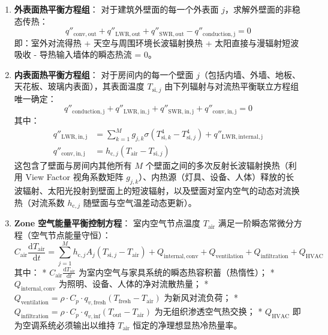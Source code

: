 \documentclass[11pt,a4paper]{article}
\begin{document}
\begin{enumerate}
    \item \textbf{外表面热平衡方程组}：
    对于建筑外壁面的每一个外表面 $j$，求解外壁面的非稳态传热：
    \begin{equation}
        q''_{\mathrm{conv,out}} + q''_{\mathrm{LWR,out}} + q''_{\mathrm{SWR,out}} - q''_{\mathrm{conduction, j}} = 0
    \end{equation}
    即：室外对流得热 + 天空与周围环境长波辐射换热 + 太阳直接与漫辐射短波吸收 - 导热输入墙体的瞬态热流 = 0。
    
    \item \textbf{内表面热平衡方程组}：
    对于房间内的每一个壁面 $j$（包括内墙、外墙、地板、天花板、玻璃内表面），其表面温度 $T_{\mathrm{si}, j}$ 由下列辐射与对流热平衡联立方程组唯一确定：
    \begin{equation}
        q''_{\mathrm{conduction, j}} + q''_{\mathrm{LWR,in, j}} + q''_{\mathrm{SWR,in, j}} + q''_{\mathrm{conv,in, j}} = 0
    \end{equation}
    其中：
    \begin{align}
        q''_{\mathrm{LWR,in, j}} &= \sum_{k=1}^{M} g_{j, k} \sigma \left(T^4_{\mathrm{si}, k} - T^4_{\mathrm{si}, j}\right) + q''_{\mathrm{LWR,internal, j}} \\
        q''_{\mathrm{conv,in, j}} &= h_{\mathrm{c}, j} \left(T_{\mathrm{air}} - T_{\mathrm{si}, j}\right)
    \end{align}
    这包含了壁面与房间内其他所有 $M$ 个壁面之间的多次反射长波辐射换热（利用 View Factor 视角系数矩阵 $g_{j,k}$）、内热源（灯具、设备、人体）释放的长波辐射、太阳光投射到壁面上的短波辐射，以及壁面对室内空气的动态对流换热（对流系数 $h_{\mathrm{c}, j}$ 随壁面与空气温差动态更新）。
    
    \item \textbf{ Zone 空气能量平衡控制方程}：
    室内空气节点温度 $T_{\mathrm{air}}$ 满足一阶瞬态常微分方程（空气节点能量守恒）：
    \begin{equation}
        C_{\mathrm{air}} \frac{\mathrm{d}T_{\mathrm{air}}}{\mathrm{d}t} = \sum_{j=1}^{M} h_{\mathrm{c}, j} A_j \left(T_{\mathrm{si}, j} - T_{\mathrm{air}}\right) + Q_{\mathrm{internal,conv}} + Q_{\mathrm{ventilation}} + Q_{\mathrm{infiltration}} + Q_{\mathrm{HVAC}}
    \end{equation}
    其中：
    * $C_{\mathrm{air}} \frac{\mathrm{d}T_{\mathrm{air}}}{\mathrm{d}t}$ 为室内空气与家具系统的瞬态热容积蓄（热惰性）；
    * $Q_{\mathrm{internal,conv}}$ 为照明、设备、人体的净对流散热量；
    * $Q_{\mathrm{ventilation}} = \rho \cdot C_p \cdot q_{v, \mathrm{fresh}} \left(T_{\mathrm{fresh}} - T_{\mathrm{air}}\right)$ 为新风对流负荷；
    * $Q_{\mathrm{infiltration}} = \rho \cdot C_p \cdot q_{v, \mathrm{inf}} \left(T_{\mathrm{out}} - T_{\mathrm{air}}\right)$ 为无组织渗透空气热交换；
    * $Q_{\mathrm{HVAC}}$ 即为空调系统必须输出以维持 $T_{\mathrm{air}}$ 恒定的净理想显热冷热量率。
\end{enumerate}
\end{document}
